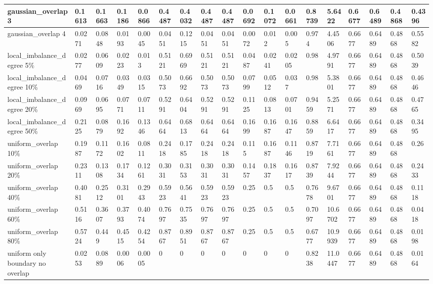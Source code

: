 \begin{landscape}
\begin{table}[tbp]
\begin{tabular}{|l|l|l|l|l|l|l|l|l|l|l|l|l|l|l|l|l|l|}
        gaussian\_overlap 3 & 0.1613 & 0.1663 & 0.1186 & 0.0866 & 0.4487 & 0.4032 & 0.4487 & 0.4487 & 0.0692 & 0.1072 & 0.0661 & 0.8739 & 5.6422 & 0.6677 & 0.6489 & 0.4868 & 0.4396 \\ \hline
        gaussian\_overlap 4 & 0.0271 & 0.0848 & 0.0193 & 0.0045 & 0.0451 & 0.1215 & 0.0451 & 0.0451 & 0.0072 & 0.012 & 0.005 & 0.974 & 4.4506 & 0.6677 & 0.6489 & 0.4868 & 0.5582 \\ \hline
        local\_imbalance\_degree 5\% & 0.0277 & 0.0609 & 0.0223 & 0.013 & 0.5121 & 0.6969 & 0.5121 & 0.5121 & 0.0487 & 0.0241 & 0.0205 & 0.98 & 4.9791 & 0.6677 & 0.6489 & 0.4868 & 0.5039 \\ \hline
        local\_imbalance\_degree 10\% & 0.0469 & 0.0716 & 0.0349 & 0.0315 & 0.5073 & 0.6692 & 0.5073 & 0.5073 & 0.0799 & 0.0512 & 0.037 & 0.98 & 5.3801 & 0.6677 & 0.6489 & 0.4868 & 0.4646 \\ \hline
        local\_imbalance\_degree 20\% & 0.0969 & 0.0695 & 0.0771 & 0.0711 & 0.5291 & 0.6404 & 0.5291 & 0.5291 & 0.1125 & 0.0813 & 0.0701 & 0.9459 & 5.2571 & 0.6677 & 0.6489 & 0.4868 & 0.4765 \\ \hline
        local\_imbalance\_degree 50\% & 0.2125 & 0.0879 & 0.1692 & 0.1346 & 0.6464 & 0.6813 & 0.6464 & 0.6464 & 0.1699 & 0.1687 & 0.1647 & 0.8859 & 6.6417 & 0.6677 & 0.6489 & 0.4868 & 0.3495 \\ \hline
        uniform\_overlap 10\% & 0.1987 & 0.1172 & 0.1602 & 0.0811 & 0.2418 & 0.1785 & 0.2418 & 0.2418 & 0.115 & 0.1687 & 0.1146 & 0.8719 & 7.7161 & 0.6677 & 0.6489 & 0.4868 & 0.26 \\ \hline
        uniform\_overlap 20\% & 0.2311 & 0.1308 & 0.1734 & 0.1261 & 0.3031 & 0.3153 & 0.3031 & 0.3031 & 0.1457 & 0.1837 & 0.1617 & 0.8739 & 7.9244 & 0.6677 & 0.6489 & 0.4868 & 0.2433 \\ \hline
        uniform\_overlap 40\% & 0.4081 & 0.2512 & 0.3101 & 0.2943 & 0.5923 & 0.5641 & 0.5923 & 0.5923 & 0.25 & 0.5 & 0.5 & 0.7678 & 9.6701 & 0.6677 & 0.6489 & 0.4868 & 0.1118 \\ \hline
        uniform\_overlap 60\% & 0.5116 & 0.3607 & 0.3793 & 0.4074 & 0.7697 & 0.7535 & 0.7697 & 0.7697 & 0.25 & 0.5 & 0.5 & 0.7097 & 10.6702 & 0.6677 & 0.6489 & 0.4868 & 0.0418 \\ \hline
        uniform\_overlap 80\% & 0.5724 & 0.449 & 0.4515 & 0.4254 & 0.8767 & 0.8951 & 0.8767 & 0.8767 & 0.25 & 0.5 & 0.5 & 0.6777 & 10.9939 & 0.6677 & 0.6489 & 0.4868 & 0.0198 \\ \hline
        uniform only boundary no overlap & 0.0253 & 0.0889 & 0.0006 & 0.0005 & 0 & 0 & 0 & 0 & 0 & 0 & 0 & 0.8238 & 11.0447 & 0.6677 & 0.6489 & 0.4868 & 0.0164 \\ \hline

\end{tabular}
\end{table}
\end{landscape}
